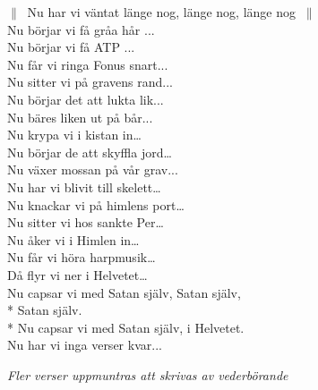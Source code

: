 \begin{SongText}
    \begin{SongVerse}
        $\|\:$ Nu har vi väntat länge nog, länge nog, länge nog $\:\|$\\%
        Nu börjar vi få gråa hår ...\\%
        Nu börjar vi få ATP ...\\%
        Nu får vi ringa Fonus snart...\\%
        Nu sitter vi på gravens rand...\\%
        Nu börjar det att lukta lik...\\%
        Nu bäres liken ut på bår...\\%
        Nu krypa vi i kistan in…\\%
        Nu börjar de att skyffla jord…\\%
        Nu växer mossan på vår grav...\\%
        Nu har vi blivit till skelett…\\%
        Nu knackar vi på himlens port…\\%
        Nu sitter vi hos sankte Per…\\%
        Nu åker vi i Himlen in…\\%
        Nu får vi höra harpmusik…\\%
        Då flyr vi ner i Helvetet…\\%
        Nu capsar vi med Satan själv, Satan själv,\\*%
        Satan själv.\\*%
        Nu capsar vi med Satan själv, i Helvetet.\\%
        Nu har vi inga verser kvar...
    \end{SongVerse}
    \begin{SongVerse}
        \textit{Fler verser uppmuntras att skrivas av vederbörande}
        \hrulefill%

        \hrulefill%

        \hrulefill%

        \hrulefill%

        \hrulefill%

        \hrulefill%

        \hrulefill%

        \hrulefill%

        \hrulefill%
    \end{SongVerse}
\end{SongText}
